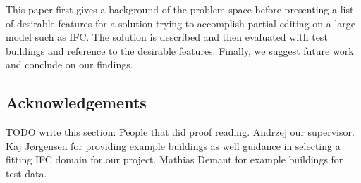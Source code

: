 This paper first gives a background of the problem space before presenting a list of desirable features for a solution trying to accomplish partial editing on a large model such as IFC. The solution is described and then evaluated with test buildings and reference to the desirable features. Finally, we suggest future work and conclude on our findings.

\subsection{Acknowledgements}
TODO write this section: People that did proof reading. Andrzej our supervisor. Kaj Jørgensen for providing example buildings as well guidance in selecting a fitting IFC domain for our project. Mathias Demant for example buildings for test data.

